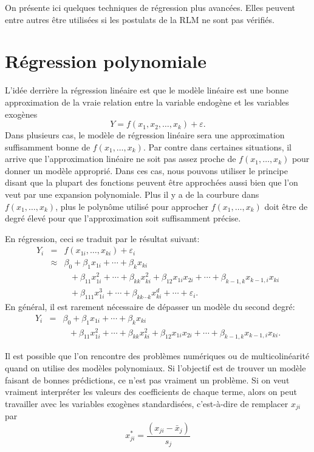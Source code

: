 


On présente ici quelques techniques de régression plus avancées. Elles peuvent entre autres être utilisées si les postulats de la RLM ne sont pas vérifiés.


\section{Régression polynomiale}
\label{sec:regpoly}

L'idée derrière la régression linéaire est que le modèle
linéaire est une bonne approximation de la \og vraie \fg relation
entre la variable endogène et les variables exogènes
$$Y=f(x_1,x_2,\ldots,x_k)+\varepsilon.$$
Dans plusieurs cas, le modèle de régression linéaire sera
une approximation suffisamment bonne de $f(x_1,\ldots,x_k)$. Par
contre dans certaines situations, il arrive que l'approximation
linéaire ne soit pas assez proche de $f(x_1,\ldots,x_k)$ pour
donner un modèle approprié. Dans ces cas, nous pouvons
utiliser le principe disant que la plupart des fonctions peuvent
\^etre approchées aussi bien que l'on veut par une expansion
polynomiale. Plus il y a de la \og courbure \fg dans
$f(x_1,\ldots,x_k)$, plus le polyn\^ome utilisé pour
approcher $f(x_1,\ldots,x_k)$ doit \^etre de degré élevé
pour que l'approximation soit suffisamment précise.

En régression, ceci se traduit par le résultat suivant:
\begin{eqnarray*}
Y_i&=&f(x_{1i},\ldots,x_{ki})+\varepsilon_i\\
&\approx&\beta_0+\beta_1x_{1i}+\cdots+\beta_kx_{ki}\\
&\ &\ \ \ +\beta_{11}x_{1i}^2+\cdots+\beta_{kk}x_{ki}^2+
\beta_{12}x_{1i}x_{2i}+\cdots+\beta_{k-1,k}x_{k-1,i}x_{ki}\\
&\ & \ \ \ +\beta_{111}x_{1i}^3+\cdots+ \beta_{kk\cdots
k}x_{ki}^d+\cdots+\varepsilon_i.
\end{eqnarray*}
En général, il est rarement nécessaire de dépasser un modèle du second degré:
\begin{eqnarray*}
Y_i&=&\beta_0+\beta_1x_{1i}+\cdots+\beta_kx_{ki}\\
&\ &\ \ \ +\beta_{11}x_{1i}^2+\cdots+\beta_{kk}x_{ki}^2+
\beta_{12}x_{1i}x_{2i}+\cdots+\beta_{k-1,k}x_{k-1,i}x_{ki}.
\end{eqnarray*}

Il est possible que l'on rencontre des problèmes numériques ou
de multicolinéarité quand on utilise des modèles polynomiaux. Si l'objectif est de trouver un modèle faisant de bonnes prédictions, ce n'est pas vraiment un problème. Si on veut vraiment interpréter les valeurs des coefficients de chaque terme, alors on peut travailler avec les variables exogènes standardisées, c'est-à-dire de
remplacer $x_{ji}$ par
$$x_{ji}^*=\frac{(x_{ji}-\bar{x}_j)}{s_j}$$

